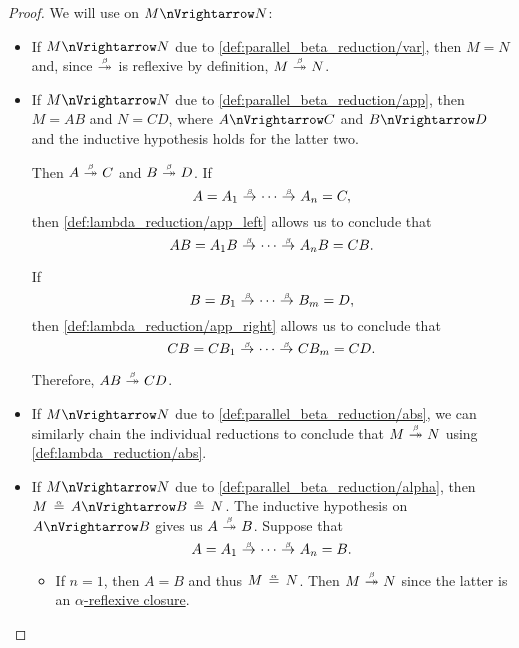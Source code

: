 \begin{proof}
   We will use  on \( M \pred N \):
  \begin{itemize}
    \item If \( M \pred N \) due to \ref{def:parallel_beta_reduction/var}, then \( M = N \) and, since \( {\bred*} \) is reflexive by definition, \( M \bred* N \).

    \item If \( M \pred N \) due to \ref{def:parallel_beta_reduction/app}, then \( M = AB \) and \( N = CD \), where \( A \pred C \) and \( B \pred D \) and the inductive hypothesis holds for the latter two.

    Then \( A \bred* C \) and \( B \bred* D \). If
    \begin{equation*}
      A = A_1 \bred \cdots \bred A_n = C,
    \end{equation*}
    then \ref{def:lambda_reduction/app_left} allows us to conclude that
    \begin{equation*}
      AB = A_1 B \bred \cdots \bred A_n B = CB.
    \end{equation*}

    If
    \begin{equation*}
      B = B_1 \bred \cdots \bred B_m = D,
    \end{equation*}
    then \ref{def:lambda_reduction/app_right} allows us to conclude that
    \begin{equation*}
      CB = C B_1 \bred \cdots \bred C B_m = CD.
    \end{equation*}

    Therefore, \( AB \bred* CD \).

    \item If \( M \pred N \) due to \ref{def:parallel_beta_reduction/abs}, we can similarly chain the individual reductions to conclude that \( M \bred* N \) using \ref{def:lambda_reduction/abs}.

    \item If \( M \pred N \) due to \ref{def:parallel_beta_reduction/alpha}, then \( M \aequiv A \pred B \aequiv N \). The inductive hypothesis on \( A \pred B \) gives us \( A \bred* B \). Suppose that
    \begin{equation*}
      A = A_1 \bred \cdots \bred A_n = B.
    \end{equation*}

    \begin{itemize}
      \item If \( n = 1 \), then \( A = B \) and thus \( M \aequiv N \). Then \( M \bred* N \) since the latter is an \hyperref[def:alpha_reflexive_closure]{\( \alpha \)-reflexive closure}.


\end{itemize}
\end{itemize}
\end{proof}
